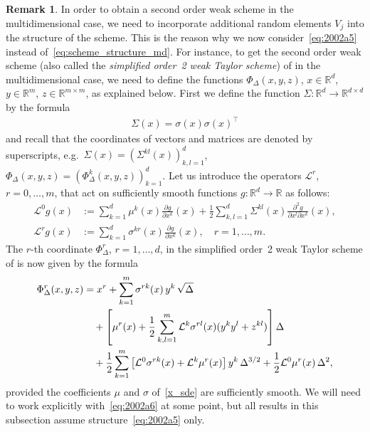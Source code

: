 \documentclass[11pt,a4paper]{amsart}
\theoremstyle{plain}
\theoremstyle{definition}
\newtheorem{remark}[theorem]{Remark}
\theoremstyle{remark}
\numberwithin{equation}{section}
\newcommand*{\bbR}{\mathbb R}
\newcommand*{\cL}{\mathcal L}
\renewcommand*{\doteq}{:=}
\begin{document}
\begin{remark}
In order to obtain a second order weak scheme
in the multidimensional case,
we need to incorporate additional
random elements $V_j$
into the structure of the scheme.
This is the reason
why we now consider~\eqref{eq:2002a5}
instead of~\eqref{eq:scheme_structure_md}.
For instance, to get the second order weak scheme (also called the
\emph{simplified order~2 weak Taylor scheme})
of \cite[Section~14.2]{KP}
in the multidimensional case,
we need to define the functions
$\Phi_{\Delta}(x,y,z)$,
$x\in\bbR^d$, $y\in\bbR^m$, $z\in\bbR^{m\times m}$,
as explained below.
First we define the function
$\Sigma\colon\bbR^d\to\bbR^{d\times d}$
by the formula
\begin{align*}
\Sigma(x)=\sigma(x)\sigma(x)^\top
\end{align*}
and recall that the coordinates
of vectors and matrices are denoted
by superscripts,
e.g.\ $\Sigma(x)=(\Sigma^{kl}(x))_{k,l=1}^d$,
$\Phi_{\Delta}(x,y,z)
=(\Phi_{\Delta}^k(x,y,z))_{k=1}^d$.
Let us introduce the operators
$\cL^r$, $r=0,\ldots,m$,
that act on sufficiently smooth functions
$g\colon\bbR^d\to\bbR$ as follows:
\begin{align*}
\cL^0 g(x)&\doteq\sum_{k=1}^d
\mu^k(x) \frac{\partial g}{\partial x^k}(x)
+\frac12 \sum_{k,l=1}^d
\Sigma^{kl}(x) \frac{\partial^2 g}{\partial x^l\partial x^k}(x),
\\
\cL^r g(x)&\doteq\sum_{k=1}^d \sigma^{kr}(x)
\frac{\partial g}{\partial x^k}(x),\quad
r=1,\ldots,m. %
\end{align*}
The $r$-th coordinate $\Phi_{\Delta}^r$,
$r=1,\ldots,d$, in the simplified order~2
weak Taylor scheme of \cite[Section~14.2]{KP}
is now given by the formula
\begin{align}
\Phi_{\Delta}^r(x,y,z)&=
x^r+\sum_{k=1}^m \sigma^{rk}(x)\,y^k\,\sqrt{\Delta}
\label{eq:2002a6}\\
&\hspace{1em}+\left[
\mu^r(x)+\frac12\sum_{k,l=1}^m
\cL^k\sigma^{rl}(x) (y^k y^l+z^{kl})
\right]\Delta
\notag\\
&\hspace{1em}+\frac12\sum_{k=1}^m
\left[
\cL^0\sigma^{rk}(x)+\cL^k \mu^r(x)
\right]
y^k\,\Delta^{3/2}
+\frac12\cL^0\mu^r(x)\,\Delta^2,
\notag
\end{align}
provided the coefficients $\mu$ and $\sigma$
of~\eqref{x_sde}
are sufficiently smooth.
We will need to work
explicitly with~\eqref{eq:2002a6}
at some point,
but all results in this subsection
assume structure~\eqref{eq:2002a5} only.
\end{remark}
\end{document}
